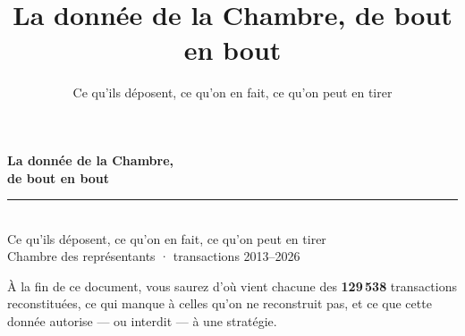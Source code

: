 \documentclass[11pt,aspectratio=169]{beamer}
\title[La donnée de la Chambre]{\textbf{La donnée de la Chambre, de bout en bout}}
\subtitle{Ce qu'ils déposent, ce qu'on en fait, ce qu'on peut en tirer}
\author{}
\date{}
\begin{document}

\begin{frame}[plain]
  \centering\vfill
  {\color{helec}\fontsize{30}{34}\selectfont\textbf{La donnée de la Chambre,}}\\[1.5mm]
  {\color{helec}\fontsize{30}{34}\selectfont\textbf{de bout en bout}}\\[5mm]
  {\color{helec!45}\rule{0.42\textwidth}{1.2pt}}\\[5mm]
  {\color{black!70}\large Ce qu'ils déposent, ce qu'on en fait, ce qu'on peut en tirer}\\[3mm]
  {\color{black!45}\footnotesize Chambre des représentants · transactions 2013--2026}\\[8mm]
  \colorbox{helec!8}{\parbox{0.84\textwidth}{\centering\footnotesize\vspace{1mm}
    À la fin de ce document, vous saurez d'où vient chacune des \textbf{129\,538} transactions
    reconstituées, ce qui manque à celles qu'on ne reconstruit pas,
    et ce que cette donnée autorise --- ou interdit --- à une stratégie.\vspace{1mm}}}
  \vfill
\end{frame}
\end{document}
